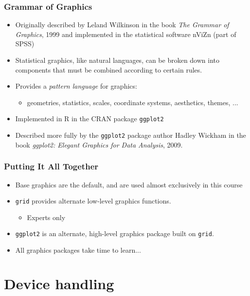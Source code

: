 \documentclass[xcolor=svgnames]{beamer}
\newcommand{\code}[1]{\texttt{#1}}
\begin{document}
\begin{frame}
  \frametitle{Grammar of Graphics}

  \begin{itemize}
  \item Originally described by Leland Wilkinson in the book {\em The
    Grammar of Graphics}, 1999 and implemented in the statistical
    software nViZn (part of SPSS)
  \item Statistical graphics, like natural languages, can be broken down
   into components that must be combined according to certain rules.
  \item Provides a {\em pattern language} for graphics:
     \begin{itemize}
     \item geometries, statistics, scales, coordinate systems,
          aesthetics, themes, ...
     \end{itemize}
   \item Implemented in R in the CRAN package \code{ggplot2}
   \item Described more fully by the \code{ggplot2} package author Hadley
      Wickham in the book {\em ggplot2: Elegant Graphics for Data Analysis},
      2009.
   \end{itemize}

\end{frame}


\begin{frame}
   \frametitle{Putting It All Together}

   \begin{itemize}
   \item Base graphics are the default, and are used almost exclusively
         in this course
   \item \code{grid} provides alternate low-level graphics functions. 
      \begin{itemize}
      \item Experts only
      \end{itemize}
   \item \code{ggplot2} is an alternate, high-level graphics package
       built on \code{grid}.
  \item All graphics packages take time to learn...
   \end{itemize}

\end{frame}

\section{Device handling} 
\end{document}
